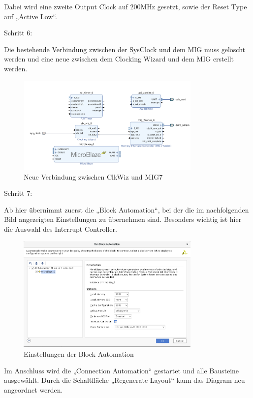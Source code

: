 Dabei wird eine zweite Output Clock auf 200MHz gesetzt, sowie der Reset Type auf „Active Low“.


Schritt 6:

Die bestehende Verbindung zwischen der SysClock und dem MIG muss gelöscht werden und eine neue zwischen dem Clocking Wizard und dem MIG erstellt werden.

\begin{figure}[H]
\centering
\includegraphics[width=0.8\textwidth]{Hauptteil/schritt6.png}
\caption{Neue Verbindung zwischen ClkWiz und MIG7}\label{fig:mbschritt6}
\end{figure}


Schritt 7:

Ab hier übernimmt zuerst die „Block Automation“, bei der die im nachfolgenden Bild angezeigten Einstellungen zu übernehmen sind.
Besonders wichtig ist hier die Auswahl des Interrupt Controller.

\begin{figure}[H]
\centering
\includegraphics[width=0.8\textwidth]{Hauptteil/schritt7.png}
\caption{Einstellungen der Block Automation}\label{fig:mbschritt7}
\end{figure}


Im Anschluss wird die „Connection Automation“ gestartet und alle Bausteine ausgewählt.
Durch die Schaltfläche „Regenerate Layout“ kann das Diagram neu angeordnet werden.\\

